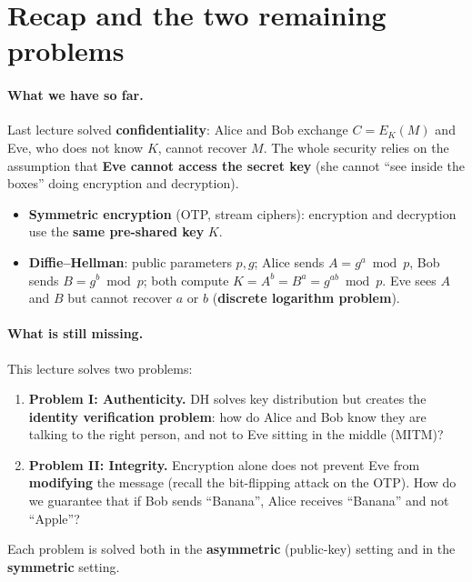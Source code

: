 

\section{Recap and the two remaining problems}

\paragraph{What we have so far.} Last lecture solved \textbf{confidentiality}: Alice and Bob exchange $C = E_K(M)$ and Eve, who does not know $K$, cannot recover $M$. The whole security relies on the assumption that \textbf{Eve cannot access the secret key} (she cannot ``see inside the boxes'' doing encryption and decryption).
\begin{itemize}
    \item \textbf{Symmetric encryption} (OTP, stream ciphers): encryption and decryption use the \textbf{same pre-shared key} $K$.
    \item \textbf{Diffie--Hellman}: public parameters $p, g$; Alice sends $A = g^a \bmod p$, Bob sends $B = g^b \bmod p$; both compute $K = A^b = B^a = g^{ab} \bmod p$. Eve sees $A$ and $B$ but cannot recover $a$ or $b$ (\textbf{discrete logarithm problem}).
\end{itemize}

\paragraph{What is still missing.} This lecture solves two problems:
\begin{enumerate}
    \item \textbf{Problem I: Authenticity.} DH solves key distribution but creates the \textbf{identity verification problem}: how do Alice and Bob know they are talking to the right person, and not to Eve sitting in the middle (MITM)?
    \item \textbf{Problem II: Integrity.} Encryption alone does not prevent Eve from \textbf{modifying} the message (recall the bit-flipping attack on the OTP). How do we guarantee that if Bob sends ``Banana'', Alice receives ``Banana'' and not ``Apple''?
\end{enumerate}
Each problem is solved both in the \textbf{asymmetric} (public-key) setting and in the \textbf{symmetric} setting.

